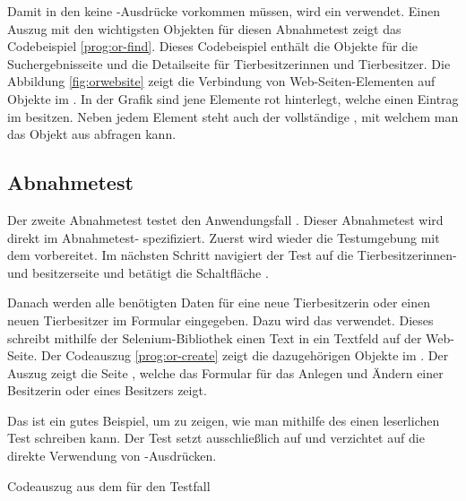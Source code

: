 \SuperPar
Damit in den  keine -Ausdrücke vorkommen müssen, wird ein  verwendet. Einen Auszug mit den wichtigsten Objekten für diesen Abnahmetest zeigt das Codebeispiel \ref{prog:or-find}. Dieses Codebeispiel enthält die Objekte für die Suchergebnisseite und die Detailseite für Tierbesitzerinnen und Tierbesitzer. Die Abbildung \ref{fig:orwebsite} zeigt die Verbindung von Web-Seiten-Elementen auf Objekte im . In der Grafik sind jene Elemente rot hinterlegt, welche einen Eintrag im  besitzen. Neben jedem Element steht auch der vollständige , mit welchem man das Objekt aus  abfragen kann.


\subsection{Abnahmetest }
\label{cha:TestenUA2}


Der zweite Abnahmetest testet den Anwendungsfall . Dieser Abnahmetest wird direkt im Abnahmetest- spezifiziert. Zuerst wird wieder die Testumgebung mit dem   vorbereitet. Im nächsten Schritt navigiert der Test auf die Tierbesitzerinnen- und besitzerseite und betätigt die Schaltfläche . 


\SuperPar
Danach werden alle benötigten Daten für eine neue Tierbesitzerin oder einen neuen Tierbesitzer im Formular eingegeben. Dazu wird das   verwendet. Dieses  schreibt mithilfe der Selenium-Bibliothek einen Text in ein Textfeld auf der Web-Seite. Der Codeauszug \ref{prog:or-create} zeigt die dazugehörigen Objekte im . Der Auszug zeigt die Seite , welche das Formular für das Anlegen und Ändern einer Besitzerin oder eines Besitzers zeigt.

\SuperPar
Das   ist ein gutes Beispiel, um zu zeigen, wie man mithilfe des  einen leserlichen Test schreiben kann. Der Test setzt ausschließlich auf   und verzichtet auf die direkte Verwendung von -Ausdrücken. 

\begin{program}

\caption{Codeauszug aus dem  für den Testfall }
\label{prog:or-create}
\end{program}

